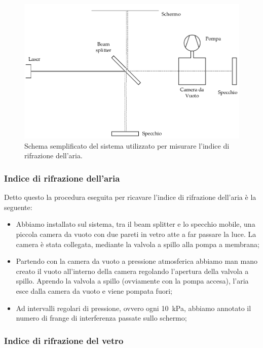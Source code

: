 

\begin{figure}
    \centering
    \includegraphics[width=120mm]{drawing.pdf}
    \caption{Schema semplificato del sistema utilizzato per misurare l'indice di rifrazione dell'aria.}
    \label{fig:mik}
\end{figure}

\subsubsection{Indice di rifrazione dell'aria}

Detto questo la procedura eseguita per ricavare l'indice di rifrazione dell'aria è la seguente:

\begin{itemize}
	\item{Abbiamo installato sul sistema, tra il beam splitter e lo specchio mobile, una piccola camera da vuoto con due pareti in vetro atte a far passare la luce. La camera è stata collegata, mediante la valvola a spillo alla pompa a membrana;}
    \item{Partendo con la camera da vuoto a pressione atmosferica abbiamo man mano creato il vuoto all'interno della camera regolando l'apertura della valvola a spillo. Aprendo la valvola a spillo (ovviamente con la pompa accesa), l'aria esce dalla camera da vuoto e viene pompata fuori;}
    \item{Ad intervalli regolari di pressione, ovvero ogni \SI{10}{\kilo\pascal}, abbiamo annotato il numero di frange di interferenza passate sullo schermo;}
\end{itemize}

\subsubsection{Indice di rifrazione del vetro}


